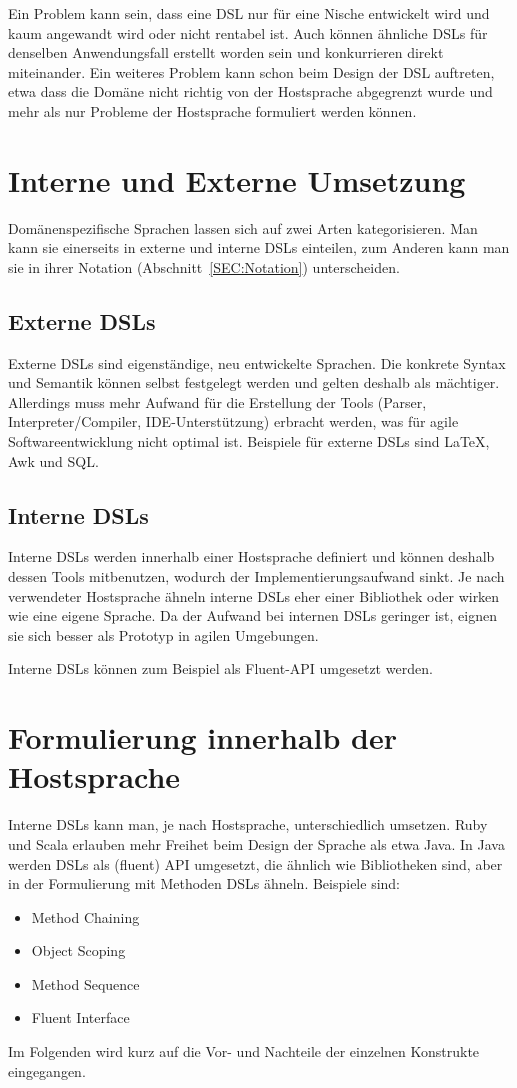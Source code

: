 \documentclass[../InterneDSLs.tex]{subfiles}
\begin{document}
Ein Problem kann sein, dass eine DSL nur für eine Nische entwickelt wird und kaum angewandt wird oder nicht rentabel ist. Auch können ähnliche DSLs für denselben Anwendungsfall erstellt worden sein und konkurrieren direkt miteinander. Ein weiteres Problem kann schon beim Design der DSL auftreten, etwa dass die Domäne nicht richtig von der Hostsprache abgegrenzt wurde und mehr als nur Probleme der Hostsprache formuliert werden können.


\section{Interne und Externe Umsetzung}
Domänenspezifische Sprachen lassen sich auf zwei Arten kategorisieren. Man kann sie einerseits in externe und interne DSLs einteilen, zum Anderen kann man sie in ihrer Notation (Abschnitt~\ref{SEC:Notation}) unterscheiden.

\subsection{Externe DSLs}
Externe DSLs sind eigenständige, neu entwickelte Sprachen. Die konkrete Syntax und Semantik können selbst festgelegt werden und gelten deshalb als mächtiger. Allerdings muss mehr Aufwand für die Erstellung der Tools (Parser, Interpreter/Compiler, \acs{IDE}-Unterstützung) erbracht werden, was für agile Softwareentwicklung nicht optimal ist. Beispiele für externe DSLs sind LaTeX, Awk und SQL.

\subsection{Interne DSLs}
Interne DSLs werden innerhalb einer Hostsprache definiert und können deshalb dessen Tools mitbenutzen, wodurch der Implementierungsaufwand sinkt. Je nach verwendeter Hostsprache ähneln interne DSLs eher einer Bibliothek oder wirken wie eine eigene Sprache. Da der Aufwand bei internen DSLs geringer ist, eignen sie sich besser als Prototyp in agilen Umgebungen.~\cite{butting2018deriving}

Interne DSLs können zum Beispiel als Fluent-\acs{API} umgesetzt werden.


\section{Formulierung innerhalb der Hostsprache}
Interne DSLs kann man, je nach Hostsprache, unterschiedlich umsetzen. Ruby und Scala erlauben mehr Freihet beim Design der Sprache als etwa Java. In Java werden DSLs als (fluent) API umgesetzt, die ähnlich wie Bibliotheken sind, aber in der Formulierung mit Methoden DSLs ähneln. Beispiele sind:
\begin{itemize}
	\item Method Chaining
	\item Object Scoping
	\item Method Sequence
	\item Fluent Interface
\end{itemize}
Im Folgenden wird kurz auf die Vor- und Nachteile der einzelnen Konstrukte eingegangen.
\end{document}
